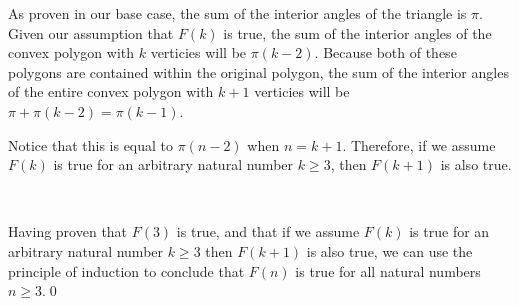 \documentclass{article}
\begin{document}
As proven in our base case, the sum of the interior angles of the triangle is $\pi $. Given our assumption that $F( k)$ is true, the sum of the interior angles of the convex polygon with $k$ verticies will be $\pi (k-2)$. Because both of these polygons are contained within the original polygon, the sum of the interior angles of the entire convex polygon with $k+1$ verticies will be $\pi +\pi ( k-2) =\pi ( k-1)$.

Notice that this is equal to $\pi ( n-2)$ when $n=k+1$. Therefore, if we assume $F(k)$ is true for an arbitrary natural number $k\geq 3$, then $F(k+1)$ is also true.

\

Having proven that $F(3)$ is true, and that if we assume $F(k)$ is true for an arbitrary natural number $k\geq 3$ then $F(k+1)$ is also true, we can use the principle of induction to conclude that $F(n)$ is true for all natural numbers $n\geq 3$.\qed 

\
\hline
\section{}
\end{document}
